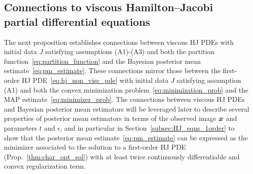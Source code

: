 \subsection{Connections to viscous Hamilton--Jacobi partial differential equations} \label{subsec:HJ_eqns_visc}
The next proposition establishes connections between viscous HJ PDEs with initial data $J$ satisfying assumptions (A1)-(A3) and both the partition function~\eqref{eq:partition_function} and the Bayesian posterior mean estimate~\eqref{eq:pm_estimate}. These connections mirror those between the first-order HJ PDE~\eqref{eq:hj_non_visc_pde} with initial data $J$ satisfying assumption (A1) and both the convex minimization problem~\eqref{eq:minimization_prob} and the MAP estimate~\eqref{eq:minimizer_prob}. The connections between viscous HJ PDEs and Bayesian posterior mean estimators will be leveraged later to describe several properties of posterior mean estimators in terms of the observed image $\boldsymbol{x}$ and parameters $t$ and $\epsilon$, and in particular in Section~\ref{subsec:HJ_eqns_1order} to show that the posterior mean estimate~\eqref{eq:pm_estimate} can be expressed as the minimizer associated to the solution to a first-order HJ PDE (Prop.~\ref{thm:char_opt_sol}) with at least twice continuously differentiable and convex regularization term.

